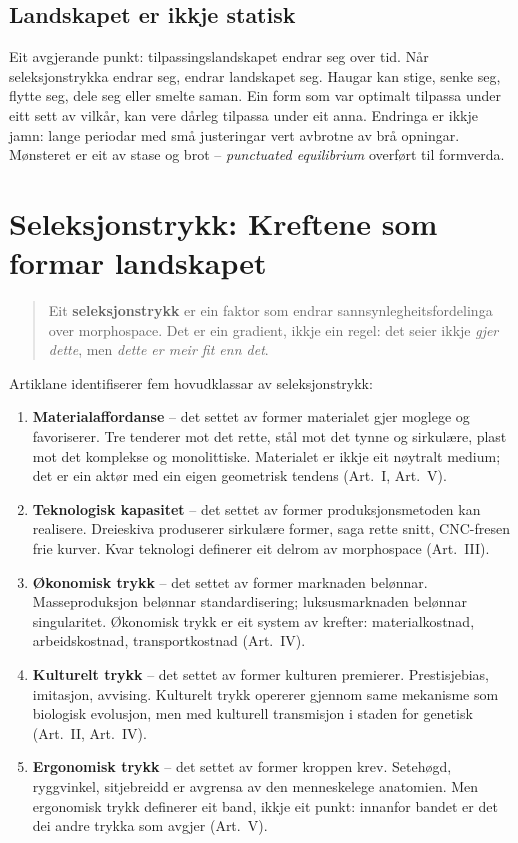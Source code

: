 \documentclass[12pt,a4paper,oneside]{report}
\begin{document}
\subsection{Landskapet er ikkje statisk}

Eit avgjerande punkt: tilpassingslandskapet endrar seg over tid. Når seleksjonstrykka endrar seg, endrar landskapet seg. Haugar kan stige, senke seg, flytte seg, dele seg eller smelte saman. Ein form som var optimalt tilpassa under eitt sett av vilkår, kan vere dårleg tilpassa under eit anna. Endringa er ikkje jamn: lange periodar med små justeringar vert avbrotne av brå opningar. Mønsteret er eit av stase og brot -- \emph{punctuated equilibrium} overført til formverda.

\section{Seleksjonstrykk: Kreftene som formar landskapet}

\begin{quote}
Eit \textbf{seleksjonstrykk} er ein faktor som endrar sannsynlegheitsfordelinga over morphospace. Det er ein gradient, ikkje ein regel: det seier ikkje \emph{gjer dette}, men \emph{dette er meir fit enn det}.
\end{quote}

Artiklane identifiserer fem hovudklassar av seleksjonstrykk:

\begin{enumerate}
  \item \textbf{Materialaffordanse} -- det settet av former materialet gjer moglege og favoriserer. Tre tenderer mot det rette, stål mot det tynne og sirkulære, plast mot det komplekse og monolittiske. Materialet er ikkje eit nøytralt medium; det er ein aktør med ein eigen geometrisk tendens (Art.~I, Art.~V).

  \item \textbf{Teknologisk kapasitet} -- det settet av former produksjonsmetoden kan realisere. Dreieskiva produserer sirkulære former, saga rette snitt, CNC-fresen frie kurver. Kvar teknologi definerer eit delrom av morphospace (Art.~III).

  \item \textbf{Økonomisk trykk} -- det settet av former marknaden belønnar. Masseproduksjon belønnar standardisering; luksusmarknaden belønnar singularitet. Økonomisk trykk er eit system av krefter: materialkostnad, arbeidskostnad, transportkostnad (Art.~IV).

  \item \textbf{Kulturelt trykk} -- det settet av former kulturen premierer. Prestisjebias, imitasjon, avvising. Kulturelt trykk opererer gjennom same mekanisme som biologisk evolusjon, men med kulturell transmisjon i staden for genetisk (Art.~II, Art.~IV).

  \item \textbf{Ergonomisk trykk} -- det settet av former kroppen krev. Setehøgd, ryggvinkel, sitjebreidd er avgrensa av den menneskelege anatomien. Men ergonomisk trykk definerer eit band, ikkje eit punkt: innanfor bandet er det dei andre trykka som avgjer (Art.~V).
\end{enumerate}
\end{document}
